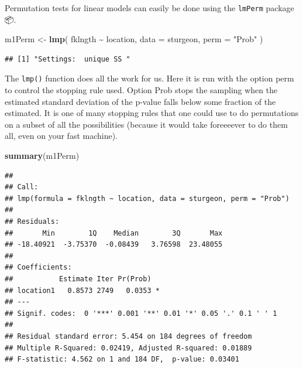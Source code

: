 \documentclass[
  12pt,
]{book}
\newenvironment{Shaded}{\begin{snugshade}}{\end{snugshade}}
\newcommand{\DataTypeTok}[1]{\textcolor[rgb]{0.13,0.29,0.53}{#1}}
\newcommand{\KeywordTok}[1]{\textcolor[rgb]{0.13,0.29,0.53}{\textbf{#1}}}
\newcommand{\NormalTok}[1]{#1}
\newcommand{\OperatorTok}[1]{\textcolor[rgb]{0.81,0.36,0.00}{\textbf{#1}}}
\newcommand{\StringTok}[1]{\textcolor[rgb]{0.31,0.60,0.02}{#1}}
\begin{document}
Permutation tests for linear models can easily be done using the \texttt{lmPerm} package 📦.

\begin{Shaded}
\begin{Highlighting}[]
\NormalTok{m1Perm \textless{}{-}}\StringTok{ }\KeywordTok{lmp}\NormalTok{(}
\NormalTok{  fklngth }\OperatorTok{\textasciitilde{}}\StringTok{ }\NormalTok{location,}
  \DataTypeTok{data =}\NormalTok{ sturgeon,}
  \DataTypeTok{perm =} \StringTok{"Prob"}
\NormalTok{)}
\end{Highlighting}
\end{Shaded}

\begin{verbatim}
## [1] "Settings:  unique SS "
\end{verbatim}

The \texttt{lmp()} function does all the work for us. Here it is run with the option perm to control the stopping rule used. Option Prob stops the sampling when the estimated standard deviation of the p-value falls below some fraction of the estimated. It is one of many stopping rules that one could use to do permutations on a subset of all the possibilities (because it would take foreeeever to do them all, even on your fast machine).

\begin{Shaded}
\begin{Highlighting}[]
\KeywordTok{summary}\NormalTok{(m1Perm)}
\end{Highlighting}
\end{Shaded}

\begin{verbatim}
## 
## Call:
## lmp(formula = fklngth ~ location, data = sturgeon, perm = "Prob")
## 
## Residuals:
##       Min        1Q    Median        3Q       Max 
## -18.40921  -3.75370  -0.08439   3.76598  23.48055 
## 
## Coefficients:
##           Estimate Iter Pr(Prob)  
## location1   0.8573 2749   0.0353 *
## ---
## Signif. codes:  0 '***' 0.001 '**' 0.01 '*' 0.05 '.' 0.1 ' ' 1
## 
## Residual standard error: 5.454 on 184 degrees of freedom
## Multiple R-Squared: 0.02419, Adjusted R-squared: 0.01889 
## F-statistic: 4.562 on 1 and 184 DF,  p-value: 0.03401
\end{verbatim}
\end{document}
